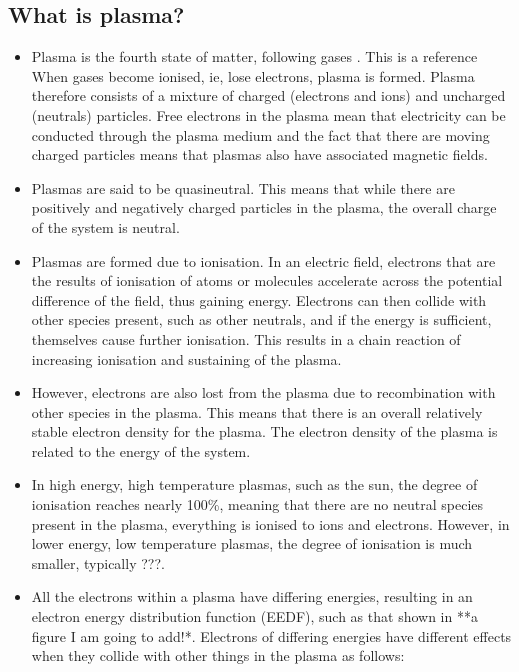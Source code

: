 \documentclass[11pt, oneside]{article}   	%
\begin{document}
\subsection{What is plasma?}

\begin{itemize}
\item Plasma is the fourth state of matter, following gases \cite{Graves2012}. This is a reference \cite{Attri2015} When gases become ionised, ie, lose electrons, plasma is formed. Plasma therefore consists of a mixture of charged (electrons and ions) and uncharged (neutrals) particles. Free electrons in the plasma mean that electricity can be conducted through the plasma medium and the fact that there are moving charged particles means that plasmas also have associated magnetic fields.
\item Plasmas are said to be quasineutral. This means that while there are positively and negatively charged particles in the plasma, the overall charge of the system is neutral.
\item Plasmas are formed due to ionisation. In an electric field, electrons that are the results of ionisation of atoms or molecules accelerate across the potential difference of the field, thus gaining energy.
Electrons can then collide with other species present, such as other neutrals, and if the energy is sufficient, themselves cause further ionisation.
This results in a chain reaction of increasing ionisation and sustaining of the plasma.
\item However, electrons are also lost from the plasma due to recombination with other species in the plasma.
This means that there is an overall relatively stable electron density for the plasma. 
The electron density of the plasma is related to the energy of the system.
\item In high energy, high temperature plasmas, such as the sun, the degree of ionisation reaches nearly 100\%, meaning that there are no neutral species present in the plasma, everything is ionised to ions and electrons. 
However, in lower energy, low temperature plasmas, the degree of ionisation is much smaller, typically ???.
\item All the electrons within a plasma have differing energies, resulting in an electron energy distribution function (EEDF), such as that shown in **a figure I am going to add!*. Electrons of differing energies have different effects when they collide with other things in the plasma as follows:
\begin{enumerate}

\end{enumerate}
\end{itemize}
\end{document}
